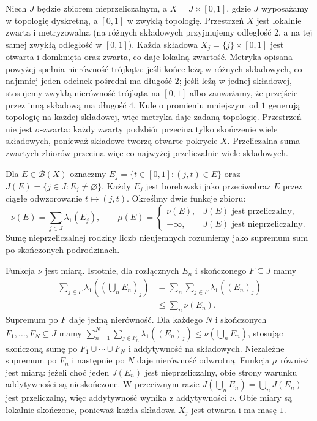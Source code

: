 \begin{przyklad}
\label{it:ex:radon-two-regularities}
Niech $J$ będzie zbiorem nieprzeliczalnym, a
$X=J\times[0,1]$, gdzie $J$ wyposażamy w topologię
dyskretną, a $[0,1]$ w zwykłą topologię.
Przestrzeń $X$ jest lokalnie zwarta i metryzowalna
(na różnych składowych przyjmujemy odległość $2$,
a na tej samej zwykłą odległość w $[0,1]$).
Każda składowa $X_j=\{j\}\times[0,1]$ jest otwarta
i domknięta oraz zwarta, co daje lokalną zwartość.
Metryka opisana powyżej spełnia nierówność trójkąta:
jeśli końce leżą w różnych składowych, co najmniej
jeden odcinek pośredni ma długość $2$; jeśli leżą
w jednej składowej, stosujemy zwykłą nierówność
trójkąta na $[0,1]$ albo zauważamy, że przejście
przez inną składową ma długość $4$.
Kule o promieniu mniejszym od $1$ generują topologię
na każdej składowej, więc metryka daje zadaną topologię.
Przestrzeń nie jest $\sigma$-zwarta: każdy zwarty podzbiór
przecina tylko skończenie wiele składowych, ponieważ
składowe tworzą otwarte pokrycie $X$. Przeliczalna
suma zwartych zbiorów przecina więc co najwyżej
przeliczalnie wiele składowych.

Dla $E\in\mathcal B(X)$ oznaczmy
$E_j=\{t\in[0,1]:(j,t)\in E\}$ oraz
$J(E)=\{j\in J:E_j\ne\varnothing\}$.
Każdy $E_j$ jest borelowski jako przeciwobraz
$E$ przez ciągłe odwzorowanie $t\mapsto(j,t)$.
Określmy dwie funkcje zbioru:
\[
 \nu(E)=\sum_{j\in J}\lambda_1(E_j),\qquad
 \mu(E)=
 \begin{cases}
 \nu(E),& J(E)\text{ jest przeliczalny},\\
 +\infty,& J(E)\text{ jest nieprzeliczalny}.
 \end{cases}
\]
Sumę nieprzeliczalnej rodziny liczb nieujemnych
rozumiemy jako supremum sum po skończonych
podrodzinach.

Funkcja $\nu$ jest miarą. Istotnie, dla rozłącznych
$E_n$ i skończonego $F\subseteq J$ mamy
\begin{align*}
 \sum_{j\in F}\lambda_1((\bigcup_n E_n)_j)
 &=\sum_n\sum_{j\in F}\lambda_1((E_n)_j)\\
 &\le\sum_n\nu(E_n).
\end{align*}
Supremum po $F$ daje jedną nierówność.
Dla każdego $N$ i skończonych $F_1,\ldots,F_N\subseteq J$
mamy
$\sum_{n=1}^N\sum_{j\in F_n}\lambda_1((E_n)_j)
\le\nu(\bigcup_n E_n)$, stosując skończoną sumę
po $F_1\cup\cdots\cup F_N$ i addytywność na składowych.
Niezależne supremum po $F_n$ i następnie po $N$
daje nierówność odwrotną.
Funkcja $\mu$ również jest miarą: jeżeli choć jeden
$J(E_n)$ jest nieprzeliczalny, obie strony warunku
addytywności są nieskończone. W przeciwnym razie
$J(\bigcup_n E_n)=\bigcup_nJ(E_n)$ jest przeliczalny,
więc addytywność wynika z addytywności $\nu$.
Obie miary są lokalnie skończone, ponieważ każda
składowa $X_j$ jest otwarta i ma masę $1$.


\end{przyklad}
